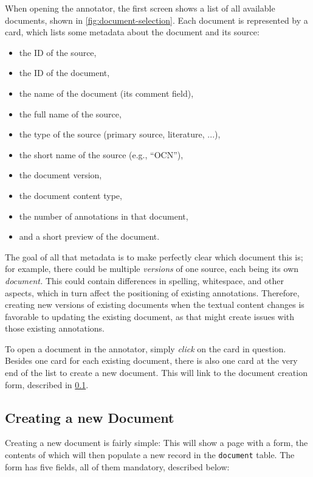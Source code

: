When opening the annotator, the first screen shows a list of all available documents, shown in \cref{fig:document-selection}.
Each document is represented by a card, which lists some metadata about the document and its source:

\begin{itemize}
  \item the ID of the source,
  \item the ID of the document,
  \item the name of the document (its comment field),
  \item the full name of the source,
  \item the type of the source (primary source, literature, ...),
  \item the short name of the source (e.g., \enquote{OCN}),
  \item the document version,
  \item the document content type,
  \item the number of annotations in that document,
  \item and a short preview of the document.
\end{itemize}

The goal of all that metadata is to make perfectly clear which document this is;
for example, there could be multiple \emph{versions} of one source, each being its own \emph{document.}
This could contain differences in spelling, whitespace, and other aspects, which in turn affect the positioning of existing annotations.
Therefore, creating new versions of existing documents when the textual content changes is favorable to updating the existing document, as that might create issues with those existing annotations.

To open a document in the annotator, simply \emph{click} on the card in question.
Besides one card for each existing document, there is also one card at the very end of the list to create a new document.
This will link to the document creation form, described in \cref{sec:document-creation}.


\subsection{Creating a new Document}
\label{sec:document-creation}

Creating a new document is fairly simple:
This will show a page with a form, the contents of which will then populate a new record in the \verb!document! table.
The form has five fields, all of them mandatory, described below:

